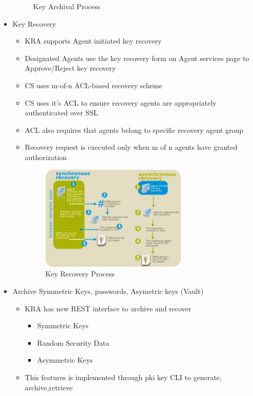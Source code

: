 \documentclass[a4paper]{article}
\begin{document}
\begin{itemize}
\begin{figure}[H]
            \caption{Key Archival Process}
        \end{figure}
    \item Key Recovery
        \begin{itemize}
            \item KRA supports Agent initiated key recovery
            \item Designated Agents use the key recovery form on Agent services page
                to Approve/Reject key recovery
            \item CS uses m-of-n ACL-based recovery scheme
            \item CS uses it's ACL to ensure recovery agents are appropriately authenticated
                over SSL
            \item ACL also requires that agents belong to specific recovery agent group
            \item Recovery request is executed only when m of n agents have granted authorization
            \begin{figure}[H]
                \centering
                \includegraphics[width=70mm]{key-recovery.png}
                \caption{Key Recovery Process}
            \end{figure}
        \end{itemize}
    \item Archive Symmetric Keys, passwords, Asymetric keys (Vault)
        \begin{itemize}
            \item KRA has new REST interface to archive and recover 
                \begin{itemize}
                    \item Symmetric Keys
                    \item Random Security Data
                    \item Asymmetric Keys
                \end{itemize}
            \item This features is implemented through pki key CLI to generate, archive,retrieve

\end{itemize}
\end{itemize}
\end{document}

